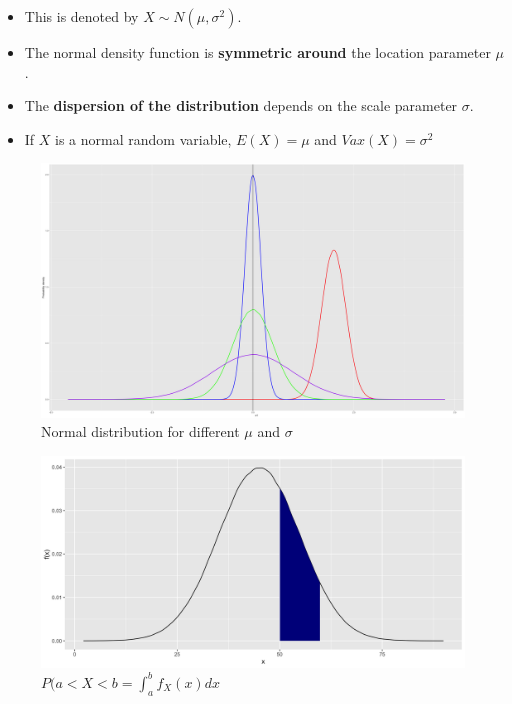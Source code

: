 \documentclass[]{book}
\begin{document}
\begin{itemize}
\item
  This is denoted by \(X \sim N(\mu, \sigma^2)\).
\item
  The normal density function is \textbf{symmetric around} the location parameter \(\mu\).
\item
  The \textbf{dispersion of the distribution} depends on the scale parameter \(\sigma\).
\item
  If \(X\) is a normal random variable, \(E(X) = \mu\) and \(Vax(X) = \sigma^2\)
\end{itemize}

\begin{figure}

{\centering \includegraphics{figure/norm-1} 

}

\caption{Normal distribution for different $\mu$ and $\sigma$}\label{fig:norm}
\end{figure}

\begin{figure}

{\centering \includegraphics{figure/norm2-1} 

}

\caption{$P(a< X < b = \int_a^b f_X(x)dx$}\label{fig:norm2}
\end{figure}
\end{document}
